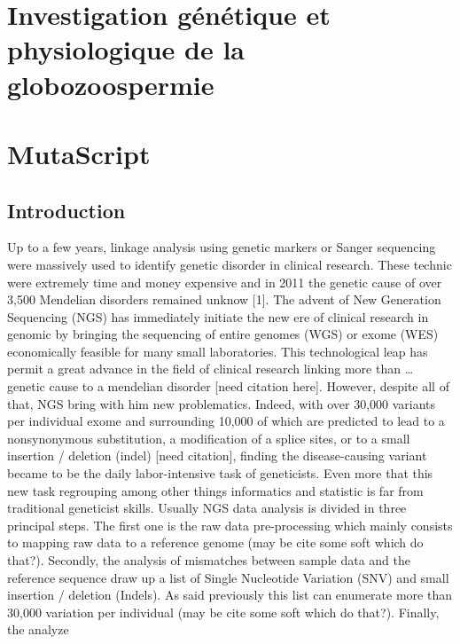 \documentclass[12pt,twoside]{reedthesis}
\theoremstyle{definition}
\theoremstyle{definition}
\theoremstyle{remark}
\begin{document}
  \hypertarget{globo}{\chapter{Investigation génétique et physiologique de
  la globozoospermie}\label{globo}}
  
  \chapter{MutaScript}\label{mutascript}
  
  \section{Introduction}\label{introduction}
  
  Up to a few years, linkage analysis using genetic markers or Sanger
  sequencing were massively used to identify genetic disorder in clinical
  research. These technic were extremely time and money expensive and in
  2011 the genetic cause of over 3,500 Mendelian disorders remained unknow
  {[}1{]}. The advent of New Generation Sequencing (NGS) has immediately
  initiate the new ere of clinical research in genomic by bringing the
  sequencing of entire genomes (WGS) or exome (WES) economically feasible
  for many small laboratories. This technological leap has permit a great
  advance in the field of clinical research linking more than \ldots{}
  genetic cause to a mendelian disorder {[}need citation here{]}. However,
  despite all of that, NGS bring with him new problematics. Indeed, with
  over 30,000 variants per individual exome and surrounding 10,000 of
  which are predicted to lead to a nonsynonymous substitution, a
  modification of a splice sites, or to a small insertion / deletion
  (indel) {[}need citation{]}, finding the disease-causing variant became
  to be the daily labor-intensive task of geneticists. Even more that this
  new task regrouping among other things informatics and statistic is far
  from traditional geneticist skills. Usually NGS data analysis is divided
  in three principal steps. The first one is the raw data pre-processing
  which mainly consists to mapping raw data to a reference genome (may be
  cite some soft which do that?). Secondly, the analysis of mismatches
  between sample data and the reference sequence draw up a list of Single
  Nucleotide Variation (SNV) and small insertion / deletion (Indels). As
  said previously this list can enumerate more than 30,000 variation per
  individual (may be cite some soft which do that?). Finally, the analyze
\end{document}
